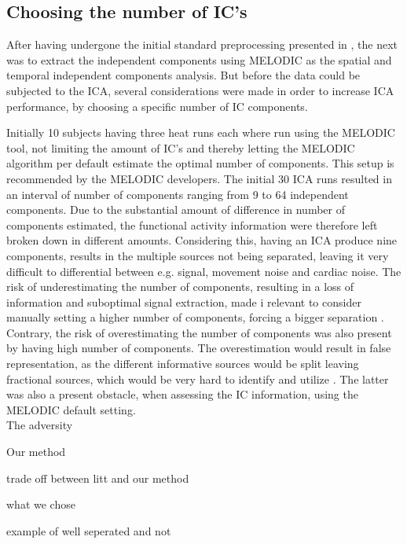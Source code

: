 
\subsection{Choosing the number of IC's}

After having undergone the initial standard preprocessing presented in , the next was to extract the independent components using MELODIC as the spatial and temporal independent components analysis. But before the data could be subjected to the ICA, several considerations were made in order to increase ICA performance, by choosing a specific number of IC components. 

Initially 10 subjects having three heat runs each where run using the MELODIC tool, not limiting the amount of IC's and thereby letting the MELODIC algorithm per default estimate the optimal number of components. This setup is recommended by the MELODIC developers. \cite{FMRIB2016,Beckmann2004} The initial 30 ICA runs resulted in an interval of number of components ranging from 9 to 64 independent components. Due to the substantial amount of difference in number of components estimated, the functional activity information were therefore left broken down in different amounts. Considering this, having an ICA produce nine components, results in the multiple sources not being separated, leaving it very difficult to differential between e.g. signal, movement noise and cardiac noise. The risk of underestimating the number of components, resulting in a loss of information and suboptimal signal extraction, made i relevant to consider manually setting a higher number of components, forcing a bigger separation \cite{Beckmann2004}. Contrary, the risk of overestimating the number of components was also present by having high number of components. The overestimation would result in false representation, as the different informative sources would be split leaving fractional sources, which would be very hard to identify and utilize \cite{Beckmann2004,Li2007}. The latter was also a present obstacle, when assessing the IC information, using the MELODIC default setting. \\

The adversity 




Our method 

trade off between litt and our method

what we chose

example of well seperated and not   